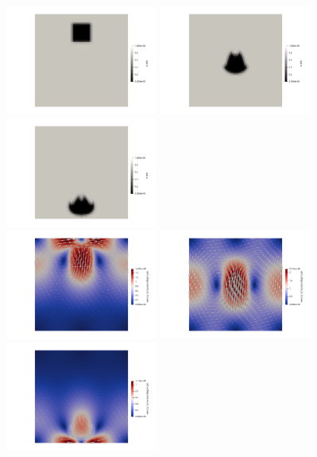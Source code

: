 \begin{center}
\includegraphics[width=5cm]{python_codes/fieldstone_67/sinking/mat0_0000.png}
\includegraphics[width=5cm]{python_codes/fieldstone_67/sinking/mat0_0070.png}
\includegraphics[width=5cm]{python_codes/fieldstone_67/sinking/mat0_0144.png}\\
\includegraphics[width=5cm]{python_codes/fieldstone_67/sinking/vel1}
\includegraphics[width=5cm]{python_codes/fieldstone_67/sinking/vel2}
\includegraphics[width=5cm]{python_codes/fieldstone_67/sinking/vel3}
\end{center}



